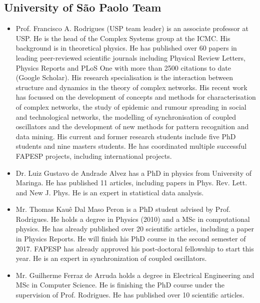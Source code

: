\subsection{University of S\~{a}o Paolo Team}
\begin{itemize}
\itemsep\myitemsep
\item {\hvnb Prof. Francisco A. Rodrigues (USP team leader)}  is an associate professor at USP.  He is the head of the Complex Systems group at the ICMC. His background is in theoretical physics. He has published over 60 papers in leading peer-reviewed scientific journals including Physical Review Letters, Physics Reports and PLoS One with more than 2500 citations to date (Google Scholar). His research specialisation is the interaction between structure and dynamics in the theory of complex networks. His recent work has focussed on the development of concepts and methods for characterisation of complex networks, the study of epidemic and rumour spreading in social and technological networks, the modelling of synchronisation of coupled oscillators and the development of new methods for pattern recognition and data mining.  His current and former research students include five PhD students and nine masters students. He has coordinated multiple  successful FAPESP projects, including international projects.

\item {\hvnb Dr. Luiz Gustavo de Andrade Alvez} has a PhD in physics from University of Maringa. He has published 11 articles, including papers in Phys. Rev. Lett. and New J. Phys. He is an expert in statistical data analysis.

\item {\hvnb Mr. Thomas Kau\^{e} Dal Maso Peron}  is a PhD student advised by Prof. Rodrigues.  He holds a degree in Physics (2010) and a MSc in computational physics. He has already published over 20 scientific articles, including a paper in Physics Reports. He will finish his PhD course in the second semester of 2017. FAPESP has already approved his post-doctoral  fellowship to start this year. He is an expert in synchronization of coupled oscillators.

\item {\hvnb Mr. Guilherme Ferraz de Arruda } holds a degree in Electrical Engineering and MSc in Computer Science. He is finishing the PhD course under the supervision of Prof. Rodrigues. He has published over 10 scientific articles.
\end{itemize}

